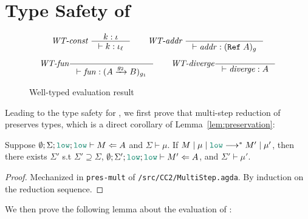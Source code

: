 \section{Type Safety of \Surface}
\label{sec:surface-type-safety}

\begin{figure}[tbp]
  \raggedright
  \begin{gather*}
    \textit{WT-const}~
    \inference{k : \iota}{\vdash k : \iota_{\ell}}
    \qquad
    \textit{WT-addr}~
    \inference{}{\vdash \mathit{addr} : (\Refer{A})_{g}}
    \\[1ex]
    \textit{WT-fun}
    \inference{}{\vdash \mathit{fun} : (\Fun{A}{g_2}{B})_{g_1}}
    \qquad
    \textit{WT-diverge}
    \inference{}{\vdash \mathit{diverge} : A}
  \end{gather*}
  \caption{Well-typed evaluation result}
  \label{fig:wt-result}
\end{figure}


Leading to the type safety for \Surface, we first prove that multi-step
reduction of \CC preserves types, which is a direct corollary of
Lemma~\ref{lem:preservation}:

\begin{lemma}
  \label{lem:pres-mult}
  Suppose $\emptyset ; \Sigma ; \low ; \low \vdash M \Leftarrow A$ and $\Sigma \vdash \mu$.
  If $\reducemult{M}{\mu}{\low}{M'}{\mu'}$,
  then there exists $\Sigma'$ s.t $\Sigma' \supseteq \Sigma$, $\emptyset ; \Sigma' ; \low ; \low \vdash M' \Leftarrow A$,
  and $\Sigma' \vdash \mu'$.
\end{lemma}
\begin{proof}
  Mechanized in \texttt{pres-mult} of \texttt{/src/CC2/MultiStep.agda}. By
  induction on the reduction sequence.
\end{proof}

We then prove the following lemma about the evaluation of \CC:


